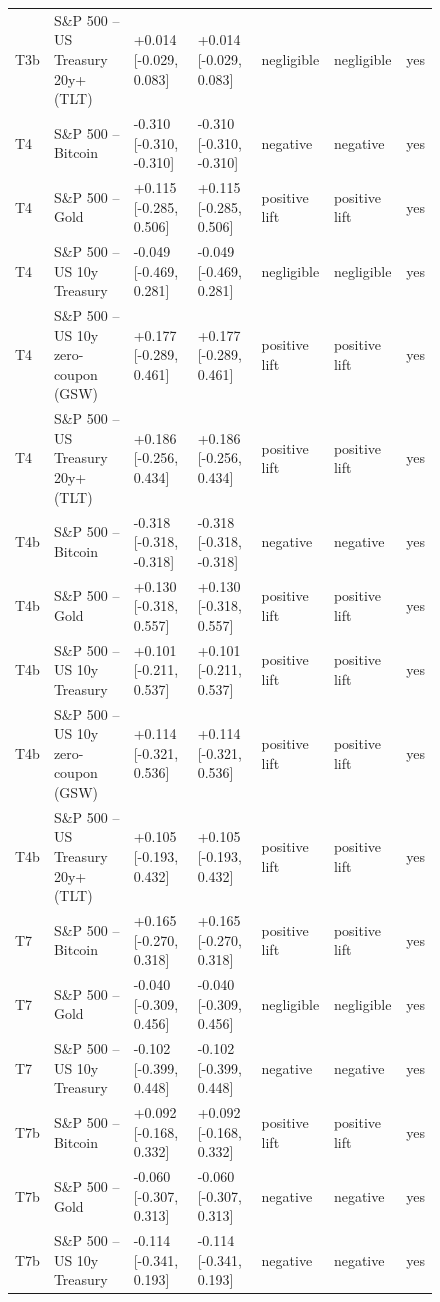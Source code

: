 \begin{figure}[t]
{\begin{tabular}{lllllll}
T3b & S\&P 500 -- US Treasury 20y+ (TLT) & +0.014 [-0.029, 0.083] & +0.014 [-0.029, 0.083] & negligible & negligible & yes \\
T4 & S\&P 500 -- Bitcoin & -0.310 [-0.310, -0.310] & -0.310 [-0.310, -0.310] & negative & negative & yes \\
T4 & S\&P 500 -- Gold & +0.115 [-0.285, 0.506] & +0.115 [-0.285, 0.506] & positive lift & positive lift & yes \\
T4 & S\&P 500 -- US 10y Treasury & -0.049 [-0.469, 0.281] & -0.049 [-0.469, 0.281] & negligible & negligible & yes \\
T4 & S\&P 500 -- US 10y zero-coupon (GSW) & +0.177 [-0.289, 0.461] & +0.177 [-0.289, 0.461] & positive lift & positive lift & yes \\
T4 & S\&P 500 -- US Treasury 20y+ (TLT) & +0.186 [-0.256, 0.434] & +0.186 [-0.256, 0.434] & positive lift & positive lift & yes \\
T4b & S\&P 500 -- Bitcoin & -0.318 [-0.318, -0.318] & -0.318 [-0.318, -0.318] & negative & negative & yes \\
T4b & S\&P 500 -- Gold & +0.130 [-0.318, 0.557] & +0.130 [-0.318, 0.557] & positive lift & positive lift & yes \\
T4b & S\&P 500 -- US 10y Treasury & +0.101 [-0.211, 0.537] & +0.101 [-0.211, 0.537] & positive lift & positive lift & yes \\
T4b & S\&P 500 -- US 10y zero-coupon (GSW) & +0.114 [-0.321, 0.536] & +0.114 [-0.321, 0.536] & positive lift & positive lift & yes \\
T4b & S\&P 500 -- US Treasury 20y+ (TLT) & +0.105 [-0.193, 0.432] & +0.105 [-0.193, 0.432] & positive lift & positive lift & yes \\
T7 & S\&P 500 -- Bitcoin & +0.165 [-0.270, 0.318] & +0.165 [-0.270, 0.318] & positive lift & positive lift & yes \\
T7 & S\&P 500 -- Gold & -0.040 [-0.309, 0.456] & -0.040 [-0.309, 0.456] & negligible & negligible & yes \\
T7 & S\&P 500 -- US 10y Treasury & -0.102 [-0.399, 0.448] & -0.102 [-0.399, 0.448] & negative & negative & yes \\
T7b & S\&P 500 -- Bitcoin & +0.092 [-0.168, 0.332] & +0.092 [-0.168, 0.332] & positive lift & positive lift & yes \\
T7b & S\&P 500 -- Gold & -0.060 [-0.307, 0.313] & -0.060 [-0.307, 0.313] & negative & negative & yes \\
T7b & S\&P 500 -- US 10y Treasury & -0.114 [-0.341, 0.193] & -0.114 [-0.341, 0.193] & negative & negative & yes \\

\end{tabular}}
\end{figure}
